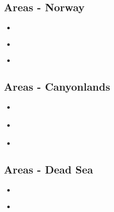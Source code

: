 \subsection{Areas - Norway} 

\begin{scriptsize}
\begin{itemize}
\item[\twothousandthirteen] 
\textcite{soma13} \\
\item[\twothousandfifteen] 
\textcite{bubj15} \\
\item[\twothousandtwentytwo] 
\textcite{pefb22} \\
\end{itemize}
\end{scriptsize}

\subsection{Areas - Canyonlands}

\begin{scriptsize}
\begin{itemize}
\item[\nineteenninetyfour]
\textcite{trca94} 
\item[\twothousandtwo]
\textcite{scwa02} 
\item[\twothousandthree]
\textcite{grsk03} 
\end{itemize}
\end{scriptsize}

\subsection{Areas - Dead Sea} 

\begin{scriptsize}
\begin{itemize}
\item[\twothousandfive]
\textcite{sopg05} \\
\item[\twothousandeleven]
\textcite{dekk11} \\
\end{itemize}
\end{scriptsize}

